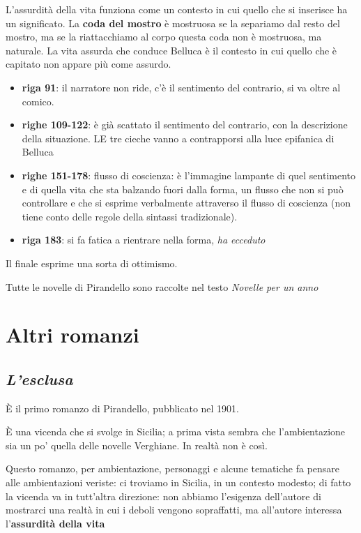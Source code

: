 \documentclass[a4paper, twoside, titlepage]{book}
\newcommand{\elenco}[1]{%
\begin{itemize}
#1
\end{itemize}}
\begin{document}
L'assurdità della vita funziona come un contesto in cui quello che si inserisce ha un significato.
La \textbf{coda del mostro} è mostruosa se la separiamo dal resto del mostro, ma se la riattacchiamo al corpo questa coda non è mostruosa, ma naturale.
La vita assurda che conduce Belluca è il contesto in cui quello che è capitato non appare più come assurdo.

\elenco{\item \textbf{riga 91}: il narratore non ride, c'è il sentimento del contrario, si va oltre al comico.
\item \textbf{righe 109-122}: è già scattato il sentimento del contrario, con la descrizione della situazione. LE tre cieche vanno a contrapporsi alla luce epifanica di Belluca
\item \textbf{righe 151-178}: flusso di coscienza: è l'immagine lampante di quel sentimento e di quella vita che sta balzando fuori dalla forma, un flusso che non si può controllare e che si esprime verbalmente attraverso il flusso di coscienza (non tiene conto delle regole della sintassi tradizionale).
\item \textbf{riga 183}: si fa fatica a rientrare nella forma, \textit{ha ecceduto}
}

Il finale esprime una sorta di ottimismo.

Tutte le novelle di Pirandello sono raccolte nel testo \textit{Novelle per un anno}








\chapter{Altri romanzi}

\section{\textit{L'esclusa}}

È il primo romanzo di Pirandello, pubblicato nel 1901.

È una vicenda che si svolge in Sicilia; a prima vista sembra che l'ambientazione sia un po' quella delle novelle Verghiane. In realtà non è così.

Questo romanzo, per ambientazione, personaggi e alcune tematiche fa pensare alle ambientazioni veriste: ci troviamo in Sicilia, in un contesto modesto; di fatto la vicenda va in tutt'altra direzione: non abbiamo l'esigenza dell'autore di mostrarci una realtà in cui i deboli vengono sopraffatti, ma all'autore interessa l'\textbf{assurdità della vita}
\end{document}
